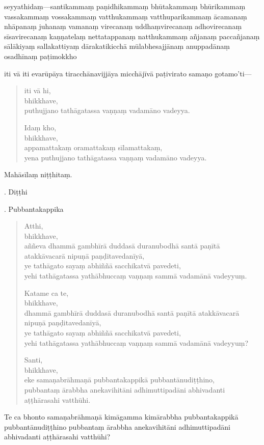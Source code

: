 \documentclass[11pt,twoside,openright]{book}
\begin{document}
\pstart
seyyathidaṃ—santikammaṃ paṇidhikammaṃ bhūtakammaṃ bhūrikammaṃ vassakammaṃ vossakammaṃ vatthukammaṃ vatthuparikammaṃ ācamanaṃ nhāpanaṃ juhanaṃ vamanaṃ virecanaṃ uddhaṃvirecanaṃ adhovirecanaṃ sīsavirecanaṃ kaṇṇatelaṃ nettatappanaṃ natthukammaṃ añjanaṃ paccañjanaṃ sālākiyaṃ sallakattiyaṃ dārakatikicchā mūlabhesajjānaṃ anuppadānaṃ osadhīnaṃ paṭimokkho
\pend

\pstart
iti vā iti evarūpāya tiracchānavijjāya micchājīvā paṭivirato samaṇo gotamo’ti—
\pend

\begin{verse}
iti vā hi,\\
\vin  bhikkhave,\\
\vin  puthujjano tathāgatassa vaṇṇaṃ vadamāno vadeyya.

Idaṃ kho,\\
\vin  bhikkhave,\\
\vin  appamattakaṃ oramattakaṃ sīlamattakaṃ,\\
\vin  yena puthujjano tathāgatassa vaṇṇaṃ vadamāno vadeyya.

\end{verse}
\pstart
Mahāsīlaṃ niṭṭhitaṃ.
\pend

. Diṭṭhi
\pend

. Pubbantakappika
\pend

\begin{verse}
Atthi,\\
\vin  bhikkhave,\\
\vin  aññeva dhammā gambhīrā duddasā duranubodhā santā paṇītā atakkāvacarā nipuṇā paṇḍitavedanīyā,\\
\vin  ye tathāgato sayaṃ abhiññā sacchikatvā pavedeti,\\
\vin  yehi tathāgatassa yathābhuccaṃ vaṇṇaṃ sammā vadamānā vadeyyuṃ.

Katame ca te,\\
\vin  bhikkhave,\\
\vin  dhammā gambhīrā duddasā duranubodhā santā paṇītā atakkāvacarā nipuṇā paṇḍitavedanīyā,\\
\vin  ye tathāgato sayaṃ abhiññā sacchikatvā pavedeti,\\
\vin  yehi tathāgatassa yathābhuccaṃ vaṇṇaṃ sammā vadamānā vadeyyuṃ?

Santi,\\
\vin  bhikkhave,\\
\vin  eke samaṇabrāhmaṇā pubbantakappikā pubbantānudiṭṭhino,\\
\vin  pubbantaṃ ārabbha anekavihitāni adhimuttipadāni abhivadanti aṭṭhārasahi vatthūhi.

\end{verse}
\pstart
Te ca bhonto samaṇabrāhmaṇā kimāgamma kimārabbha pubbantakappikā pubbantānudiṭṭhino pubbantaṃ ārabbha anekavihitāni adhimuttipadāni abhivadanti aṭṭhārasahi vatthūhi?
\pend
\end{document}
